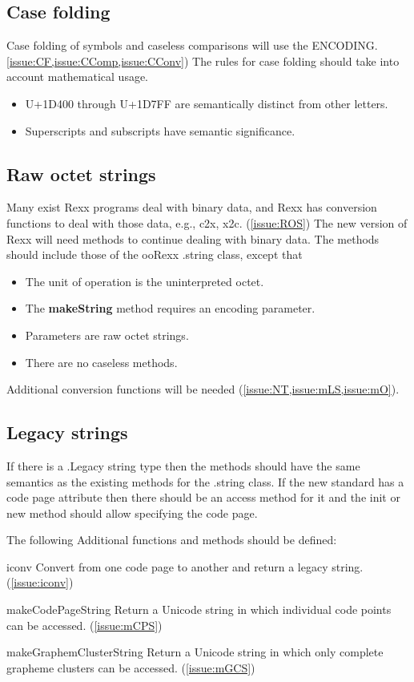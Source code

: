 \documentclass[b4paper]{article}
\begin{document}
\subsection{Case folding}

Case folding of symbols and caseless comparisons will use the ENCODING.
\cref{issue:CF,issue:CComp,issue:CConv})
The rules for case folding should take into account mathematical usage.
\begin{itemize}
\item U+1D400 through U+1D7FF are semantically distinct from other letters.
\item Superscripts and subscripts have semantic significance.
\end{itemize}

\subsection{Raw octet strings}
Many exist Rexx programs deal with binary data,
and Rexx has conversion functions to deal with those data,
e.g., c2x, x2c.
(\cref{issue:ROS})
The new version of Rexx will need methods to continue dealing with binary data.
The methods should include those of the ooRexx .string class, except that
\begin{itemize}
\item The unit of operation is the uninterpreted octet.
\item The \textbf{makeString} method requires an encoding parameter.
\item Parameters are raw octet strings.
\item There are no caseless methods.
\end{itemize}

Additional conversion functions will be needed (\cref{issue:NT,issue:mLS,issue:mO}).

\subsection{Legacy strings}

If there is a .Legacy string type then the methods should have the
same semantics as the existing methods for the .string class.
If the new standard has a code page attribute then there should be an
access method for it and the init or new method should allow
specifying the code page.

The following Additional functions and methods should be defined:
\begin{definition}
\item [iconv] %
Convert from one code page to another and return a legacy string. (\cref{issue:iconv})
\item [makeCodePageString] %
Return a Unicode string in which individual code points can be accessed. (\cref{issue:mCPS})
\item [makeGraphemClusterString] %
Return a Unicode string in which only complete grapheme clusters can be accessed. (\cref{issue:mGCS})
\end{definition}
\end{document}
